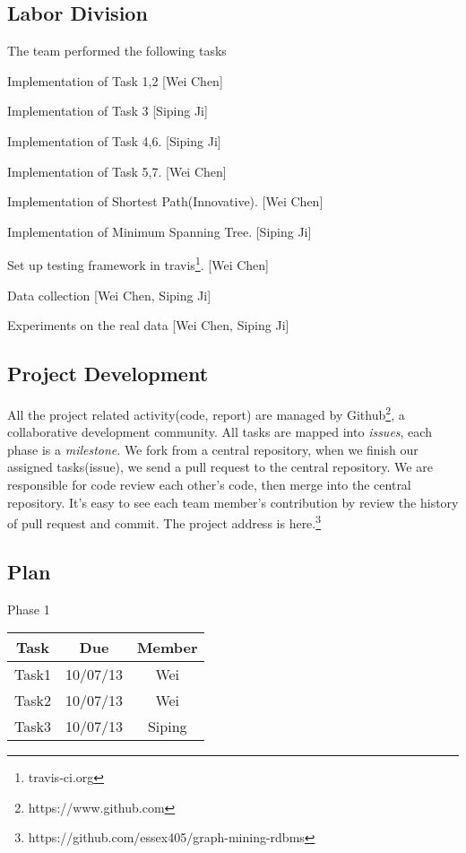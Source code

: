 \subsection{Labor Division}

The team performed the following tasks
\bit
\item Implementation of Task 1,2 [Wei Chen]
\item Implementation of Task 3 [Siping Ji]
\item Implementation of Task 4,6. [Siping Ji]
\item Implementation of Task 5,7. [Wei Chen]
\item Implementation of Shortest Path(Innovative). [Wei Chen]
\item Implementation of Minimum Spanning Tree. [Siping Ji]
\item Set up testing framework in travis\footnote{travis-ci.org}. [Wei Chen]
\item Data collection [Wei Chen, Siping Ji]
\item Experiments on the real data [Wei Chen, Siping Ji]
\eit

\subsection{Project Development}
All the project related activity(code, report) are managed by Github\footnote{https://www.github.com}, a collaborative development community. All tasks are mapped into \emph{issues}, each phase is a \emph{milestone}. We fork from a central repository, when we finish our assigned tasks(issue), we send a pull request to the central repository. We are responsible for code review each other's code, then merge into the central repository. It's easy to see each team member's contribution by review the history of pull request and commit. The project address is here.\footnote{https://github.com/essex405/graph-mining-rdbms}

\subsection{Plan}

\begin{center}
Phase 1\\
\begin{tabular}{|c|c|c|}
\hline
Task & Due & Member \\\hline
Task1 & 10/07/13 & Wei\\\hline
Task2 & 10/07/13 & Wei\\\hline
Task3 & 10/07/13 & Siping\\\hline
\end{tabular}
\end{center}

